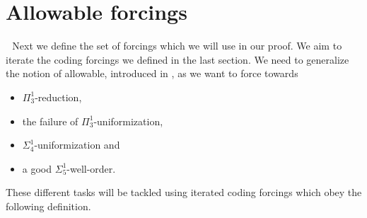 \documentclass[a4paper,11pt]{article}
\begin{document}
    \section{Allowable forcings}
    ﻿
    ﻿
    Next we define the set of forcings which we will use in our proof. We aim to iterate the coding forcings we defined in the last section. We need to generalize the notion of allowable, introduced in \cite{Reduction}, as  we  want to force towards 
\begin{itemize}
\item $\Pi^1_3$-reduction,
\item the failure of $\Pi^1_3$-uniformization,
\item $\Sigma^1_4$-uniformization and
\item a good $\Sigma^1_5$-well-order.
\end{itemize}
These different tasks will be tackled using iterated coding forcings which obey the following definition.
    ﻿
\end{document}
